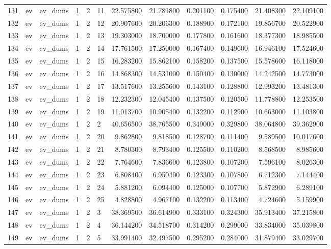 \begin{tabular}{llllllrrrrrr}
131 & ev & ev_dums & 1 & 2 & 11 & 22.575800 & 21.781800 & 0.201100 & 0.175400 & 21.408300 & 22.109100 \\
132 & ev & ev_dums & 1 & 2 & 12 & 20.907600 & 20.206300 & 0.188900 & 0.172100 & 19.856700 & 20.522900 \\
133 & ev & ev_dums & 1 & 2 & 13 & 19.303000 & 18.700000 & 0.177800 & 0.161600 & 18.377300 & 18.985500 \\
134 & ev & ev_dums & 1 & 2 & 14 & 17.761500 & 17.250000 & 0.167400 & 0.149600 & 16.946100 & 17.524600 \\
135 & ev & ev_dums & 1 & 2 & 15 & 16.283200 & 15.862100 & 0.158200 & 0.137500 & 15.578600 & 16.118000 \\
136 & ev & ev_dums & 1 & 2 & 16 & 14.868300 & 14.531000 & 0.150400 & 0.130000 & 14.242500 & 14.773000 \\
137 & ev & ev_dums & 1 & 2 & 17 & 13.517600 & 13.255600 & 0.143100 & 0.128800 & 12.993200 & 13.481300 \\
138 & ev & ev_dums & 1 & 2 & 18 & 12.232300 & 12.045400 & 0.137500 & 0.120500 & 11.778800 & 12.253500 \\
139 & ev & ev_dums & 1 & 2 & 19 & 11.013700 & 10.905400 & 0.132200 & 0.112900 & 10.663000 & 11.103800 \\
140 & ev & ev_dums & 1 & 2 & 2 & 40.656500 & 38.765500 & 0.349000 & 0.329800 & 38.064800 & 39.362900 \\
141 & ev & ev_dums & 1 & 2 & 20 & 9.862800 & 9.818500 & 0.128700 & 0.111400 & 9.589500 & 10.017600 \\
142 & ev & ev_dums & 1 & 2 & 21 & 8.780300 & 8.793400 & 0.125500 & 0.110200 & 8.568500 & 8.985600 \\
143 & ev & ev_dums & 1 & 2 & 22 & 7.764600 & 7.836600 & 0.123800 & 0.107200 & 7.596100 & 8.026300 \\
144 & ev & ev_dums & 1 & 2 & 23 & 6.808400 & 6.950400 & 0.123300 & 0.107800 & 6.712300 & 7.144400 \\
145 & ev & ev_dums & 1 & 2 & 24 & 5.881200 & 6.094400 & 0.125000 & 0.107700 & 5.872900 & 6.289100 \\
146 & ev & ev_dums & 1 & 2 & 25 & 4.828800 & 4.967100 & 0.132200 & 0.113400 & 4.724600 & 5.159900 \\
147 & ev & ev_dums & 1 & 2 & 3 & 38.369500 & 36.614900 & 0.333100 & 0.324300 & 35.913400 & 37.215800 \\
148 & ev & ev_dums & 1 & 2 & 4 & 36.144200 & 34.518700 & 0.314200 & 0.299000 & 33.834000 & 35.039800 \\
149 & ev & ev_dums & 1 & 2 & 5 & 33.991400 & 32.497500 & 0.295200 & 0.284000 & 31.879400 & 33.029700 \\

\end{tabular}

